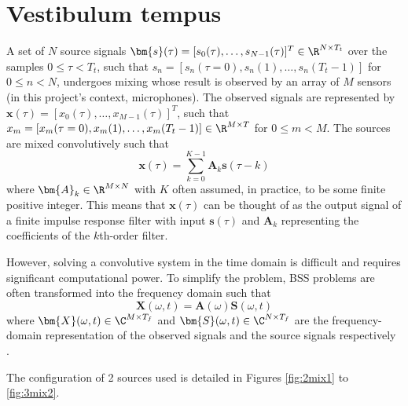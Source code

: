 \section{Vestibulum tempus}

A set of $N$ source signals $\bm{s}(\tau) = [s_0(\tau), \dots, s_{N-1}(\tau)]^T \in \R^{N \times T_t}$ over the samples $0\le \tau < T_t$, such that $s_n = [s_n(\tau = 0), s_n(1), \dots, s_n(T_t - 1)]$ for $0 \le n < N$, undergoes mixing whose result is observed by an array of $M$ sensors (in this project's context, microphones). The observed signals are represented by $\bm{x}(\tau) = [x_0(\tau), \dots, x_{M-1}(\tau)]^T$, such that $x_m = [x_m(\tau = 0), x_m(1), \dots, x_m(T_t - 1)] \in \R^{M \times T}$ for $0 \le m < M$. The sources are mixed convolutively such that
\begin{equation}
    \bm{x}(\tau) = \sum_{k = 0}^{K - 1} \bm{A}_k \bm{s}(\tau - k)
\end{equation}
where $\bm{A}_k \in \R^{M\times N}$ with $K$ often assumed, in practice, to be some finite positive integer. This means that $\bm{x}(\tau)$ can be thought of as the output signal of a finite impulse response filter with input $\bm{s}(\tau)$ and $\bm{A}_k$ representing the coefficients of the $k$th-order filter. 

However, solving a convolutive system in the time domain is difficult and requires significant computational power. To simplify the problem, BSS problems are often transformed into the frequency domain such that
\begin{equation}
    \bm{X}(\omega, t) = \bm{A}(\omega) \bm{S}(\omega, t)
\end{equation}
where $\bm{X}(\omega, t) \in \C^{M \times T_f}$ and $\bm{S}(\omega, t) \in \C^{N \times T_f}$ are the frequency-domain representation of the observed signals and the source signals respectively \parencite{smaragdis1998blind}.

The configuration of 2 sources used is detailed in Figures \ref{fig:2mix1} to \ref{fig:3mix2}. %

\newpage
